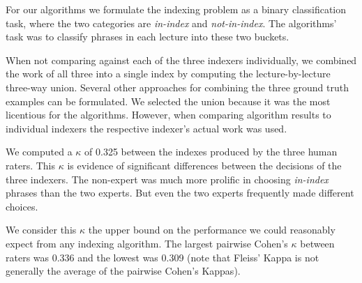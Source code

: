 For our algorithms we formulate the indexing problem as a binary
classification task, where the two categories are {\em in-index} and
{\em not-in-index}. The algorithms' task was to classify phrases in
each lecture into these two buckets.


When not comparing against each of the three indexers individually, we
combined the work of all three into a single index by computing the
lecture-by-lecture three-way union. Several other approaches for
combining the three ground truth examples can be formulated. We
selected the union because it was the most licentious for the
algorithms. However, when comparing algorithm results to individual
indexers the respective indexer's actual work was used.

We computed a $\kappa$ of 0.325 between the indexes produced by the
three human raters. This $\kappa$ is evidence of significant
differences between the decisions of the three indexers. The
non-expert was much more prolific in choosing {\em in-index} phrases
than the two experts. But even the two experts frequently made
different choices.

We consider this $\kappa$ the upper bound on the performance we could
reasonably expect from any indexing algorithm. The largest pairwise
Cohen's $\kappa$ between raters was 0.336 and the lowest was 0.309
(note that Fleiss' Kappa is not generally the average of the pairwise
Cohen's Kappas).
